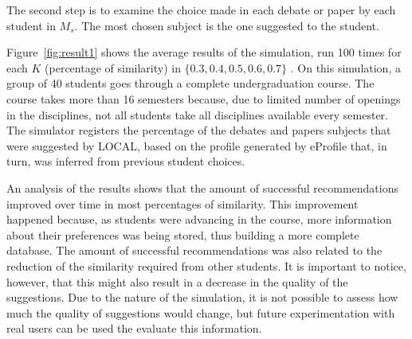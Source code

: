 \documentclass[preprint,authoryear,12pt,dvipdfm]{elsarticle}
\begin{document}
The second step is to examine the choice made in each debate or paper by each student in $M_s$. The most chosen subject is the one suggested to the student.



Figure~\ref{fig:result1} shows the average results of the simulation, run 100 times for each $K$ (percentage of similarity) in $\{ 0.3, 0.4, 0.5, 0.6, 0.7\}$ . On this simulation, a group of 40 students goes through a complete undergraduation course. The course takes more than 16 semesters because, due to limited number of openings in the disciplines, not all students take all disciplines available every semester. The simulator registers the percentage of the debates and papers subjects that were suggested by LOCAL, based on the profile generated by eProfile that, in turn, was inferred from previous student choices.

An analysis of the results shows that the amount of successful recommendations improved over time in most percentages of similarity. This improvement happened because, as students were advancing in the course, more information about their preferences was being stored, thus building a more complete database. The amount of successful recommendations was also related to the reduction of the similarity required from other students. It is important to notice, however, that this might also result in a decrease in the quality of the suggestions. Due to the nature of the simulation, it is not possible to assess how much the quality of suggestions would change, but future experimentation with real users can be used the evaluate this information.
\end{document}
